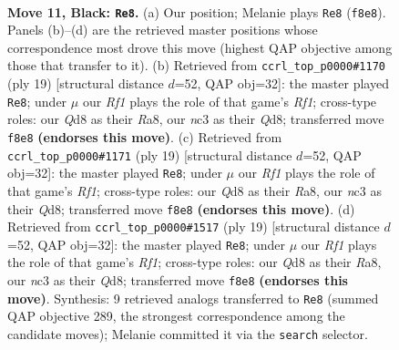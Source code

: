 \documentclass[11pt]{article}
\begin{document}
\begin{figure}[p]
\label{fig:thought-m19}
\end{figure}

\clearpage

\begin{figure}[p]\centering
\begin{subfigure}{0.46\textwidth}\centering
\resizebox{\linewidth}{!}{%
\newchessgame
\chessboard[
  setfen={r2q1rk1/1p1bbppp/p1n1pn2/2Pp2B1/3P4/P1N2N2/1P2BPPP/R2Q1RK1 b - - 1 11},
  showmover=false,
  pgfstyle=straightmove, color=movearrow, markmove={f8-e8}
]}
\caption{}
\end{subfigure}\hfill
\begin{subfigure}{0.46\textwidth}\centering
\resizebox{\linewidth}{!}{%
\newchessgame
\chessboard[
  setfen={r1bq1rk1/1p1nbppp/p1p2n2/3p2B1/3P4/2NBPN2/PP3PPP/2RQ1RK1 b - - 1 10},
  showmover=false,
  pgfstyle=straightmove, color=movearrow, markmove={f8-e8}
]}
\caption{}
\end{subfigure}
\\[4pt]
\begin{subfigure}{0.46\textwidth}\centering
\resizebox{\linewidth}{!}{%
\newchessgame
\chessboard[
  setfen={r1bq1rk1/1p1nbppp/p1p2n2/3p2B1/3P4/2NBPN2/PP3PPP/2RQ1RK1 b - - 1 10},
  showmover=false,
  pgfstyle=straightmove, color=movearrow, markmove={f8-e8}
]}
\caption{}
\end{subfigure}\hfill
\begin{subfigure}{0.46\textwidth}\centering
\resizebox{\linewidth}{!}{%
\newchessgame
\chessboard[
  setfen={r1bq1rk1/1p1nbppp/p1p2n2/3p2B1/3P4/2NBPN2/PP3PPP/2RQ1RK1 b - - 1 10},
  showmover=false,
  pgfstyle=straightmove, color=movearrow, markmove={f8-e8}
]}
\caption{}
\end{subfigure}
\caption{\textbf{Move 11, Black: \texttt{Re8}.} (a) Our position; Melanie plays \texttt{Re8} (\texttt{f8e8}). Panels (b)--(d) are the retrieved master positions whose correspondence most drove this move (highest QAP objective among those that transfer to it). (b) Retrieved from \texttt{ccrl\_top\_p0000\#1170} (ply 19) [structural distance $d$=52, QAP obj=32]: the master played \texttt{Re8}; under $\mu$ our \emph{Rf1} plays the role of that game's \emph{Rf1}; cross-type roles: our \emph{Q}d8 as their \emph{R}a8, our \emph{n}c3 as their \emph{Q}d8; transferred move \texttt{f8e8} \textbf{(endorses this move)}. (c) Retrieved from \texttt{ccrl\_top\_p0000\#1171} (ply 19) [structural distance $d$=52, QAP obj=32]: the master played \texttt{Re8}; under $\mu$ our \emph{Rf1} plays the role of that game's \emph{Rf1}; cross-type roles: our \emph{Q}d8 as their \emph{R}a8, our \emph{n}c3 as their \emph{Q}d8; transferred move \texttt{f8e8} \textbf{(endorses this move)}. (d) Retrieved from \texttt{ccrl\_top\_p0000\#1517} (ply 19) [structural distance $d$=52, QAP obj=32]: the master played \texttt{Re8}; under $\mu$ our \emph{Rf1} plays the role of that game's \emph{Rf1}; cross-type roles: our \emph{Q}d8 as their \emph{R}a8, our \emph{n}c3 as their \emph{Q}d8; transferred move \texttt{f8e8} \textbf{(endorses this move)}. Synthesis: 9 retrieved analogs transferred to \texttt{Re8} (summed QAP objective 289, the strongest correspondence among the candidate moves); Melanie committed it via the \texttt{search} selector.}

\end{figure}
\end{document}
